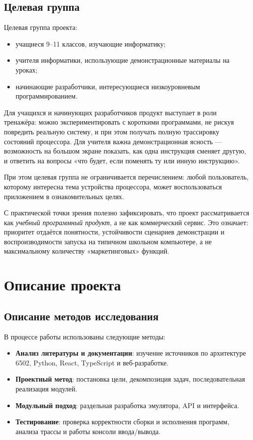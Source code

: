 \documentclass[12pt,a4paper]{article}
\begin{document}
\subsection{Целевая группа}
Целевая группа проекта:
\begin{itemize}
  \item учащиеся 9--11 классов, изучающие информатику;
  \item учителя информатики, использующие демонстрационные материалы на уроках;
  \item начинающие разработчики, интересующиеся низкоуровневым программированием.
\end{itemize}

Для учащихся и начинующих разработчиков продукт выступает в роли тренажёра: можно экспериментировать с короткими программами, не рискуя повредить реальную систему, и при этом получать полную трассировку состояний процессора. Для учителя важна демонстрационная ясность --- возможность на большом экране показать, как одна инструкция сменяет другую, и ответить на вопросы «что будет, если поменять ту или инную инструкцию».

При этом целевая группа не ограничивается перечислением: любой пользователь, которому интересна тема устройства процессора, может воспользоваться приложением в ознакомительных целях. 

С практической точки зрения полезно зафиксировать, что проект рассматривается как \textit{учебный программный продукт}, а не как коммерческий сервис. Это означает: приоритет отдаётся понятности, устойчивости сценариев демонстрации и воспроизводимости запуска на типичном школьном компьютере, а не максимальному количеству «маркетинговых» функций.


\section{Описание проекта}

\subsection{Описание методов исследования}
В процессе работы использованы следующие методы:
\begin{itemize}
  \item \textbf{Анализ литературы и документации}: изучение источников по архитектуре 6502, Python, React, TypeScript и веб-разработке.
  \item \textbf{Проектный метод}: постановка цели, декомпозиция задач, последовательная реализация модулей.
  \item \textbf{Модульный подход}: раздельная разработка эмулятора, API и интерфейса.
  \item \textbf{Тестирование}: проверка корректности сборки и исполнения программ, анализа трассы и работы консоли ввода/вывода.
\end{itemize}
\end{document}
